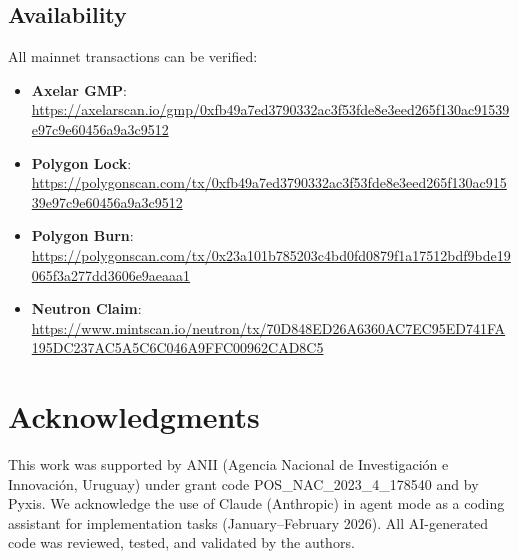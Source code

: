 \documentclass[conference,10pt]{IEEEtran}
\begin{document}
\subsection*{Availability}

All mainnet transactions can be verified:
\begin{itemize}
    \item \textbf{Axelar GMP}: \url{https://axelarscan.io/gmp/0xfb49a7ed3790332ac3f53fde8e3eed265f130ac91539e97c9e60456a9a3c9512}
    \item \textbf{Polygon Lock}: \url{https://polygonscan.com/tx/0xfb49a7ed3790332ac3f53fde8e3eed265f130ac91539e97c9e60456a9a3c9512}
    \item \textbf{Polygon Burn}: \url{https://polygonscan.com/tx/0x23a101b785203c4bd0fd0879f1a17512bdf9bde19065f3a277dd3606e9aeaaa1}
    \item \textbf{Neutron Claim}: \url{https://www.mintscan.io/neutron/tx/70D848ED26A6360AC7EC95ED741FA195DC237AC5A5C6C046A9FFC00962CAD8C5}
\end{itemize}

\section*{Acknowledgments}

This work was supported by ANII (Agencia Nacional de Investigaci\'on e Innovaci\'on, Uruguay) under grant code POS\_NAC\_2023\_4\_178540 and by Pyxis. We acknowledge the use of Claude (Anthropic) in agent mode as a coding assistant for implementation tasks (January--February 2026). All AI-generated code was reviewed, tested, and validated by the authors.
\end{document}
